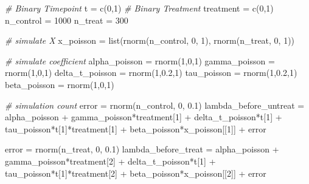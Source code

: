 \documentclass[
]{article}
\newenvironment{Shaded}{\begin{snugshade}}{\end{snugshade}}
\newcommand{\CommentTok}[1]{\textcolor[rgb]{0.56,0.35,0.01}{\textit{#1}}}
\newcommand{\DecValTok}[1]{\textcolor[rgb]{0.00,0.00,0.81}{#1}}
\newcommand{\FloatTok}[1]{\textcolor[rgb]{0.00,0.00,0.81}{#1}}
\newcommand{\FunctionTok}[1]{\textcolor[rgb]{0.00,0.00,0.00}{#1}}
\newcommand{\NormalTok}[1]{#1}
\newcommand{\OtherTok}[1]{\textcolor[rgb]{0.56,0.35,0.01}{#1}}
\newcommand{\SpecialCharTok}[1]{\textcolor[rgb]{0.00,0.00,0.00}{#1}}
\begin{document}
\begin{Shaded}
\begin{Highlighting}[]
\CommentTok{\# Binary Timepoint}
\NormalTok{t }\OtherTok{=} \FunctionTok{c}\NormalTok{(}\DecValTok{0}\NormalTok{,}\DecValTok{1}\NormalTok{)}
\CommentTok{\# Binary Treatment}
\NormalTok{treatment }\OtherTok{=} \FunctionTok{c}\NormalTok{(}\DecValTok{0}\NormalTok{,}\DecValTok{1}\NormalTok{)}
\NormalTok{n\_control }\OtherTok{=} \DecValTok{1000}
\NormalTok{n\_treat }\OtherTok{=} \DecValTok{300}

\CommentTok{\# simulate X}
\NormalTok{x\_poisson }\OtherTok{=} \FunctionTok{list}\NormalTok{(}\FunctionTok{rnorm}\NormalTok{(n\_control, }\DecValTok{0}\NormalTok{, }\DecValTok{1}\NormalTok{), }\FunctionTok{rnorm}\NormalTok{(n\_treat, }\DecValTok{0}\NormalTok{, }\DecValTok{1}\NormalTok{))}

\CommentTok{\# simulate coefficient}
\NormalTok{alpha\_poisson }\OtherTok{=} \FunctionTok{rnorm}\NormalTok{(}\DecValTok{1}\NormalTok{,}\DecValTok{0}\NormalTok{,}\DecValTok{1}\NormalTok{)}
\NormalTok{gamma\_poisson }\OtherTok{=} \FunctionTok{rnorm}\NormalTok{(}\DecValTok{1}\NormalTok{,}\DecValTok{0}\NormalTok{,}\DecValTok{1}\NormalTok{)}
\NormalTok{delta\_t\_poisson }\OtherTok{=} \FunctionTok{rnorm}\NormalTok{(}\DecValTok{1}\NormalTok{,}\FloatTok{0.2}\NormalTok{,}\DecValTok{1}\NormalTok{)}
\NormalTok{tau\_poisson }\OtherTok{=} \FunctionTok{rnorm}\NormalTok{(}\DecValTok{1}\NormalTok{,}\FloatTok{0.2}\NormalTok{,}\DecValTok{1}\NormalTok{)}
\NormalTok{beta\_poisson }\OtherTok{=} \FunctionTok{rnorm}\NormalTok{(}\DecValTok{1}\NormalTok{,}\DecValTok{0}\NormalTok{,}\DecValTok{1}\NormalTok{)}

\CommentTok{\# simulation count}
\NormalTok{error }\OtherTok{=} \FunctionTok{rnorm}\NormalTok{(n\_control, }\DecValTok{0}\NormalTok{, }\FloatTok{0.1}\NormalTok{)}
\NormalTok{lambda\_before\_untreat }\OtherTok{=}\NormalTok{ alpha\_poisson }\SpecialCharTok{+}\NormalTok{ gamma\_poisson}\SpecialCharTok{*}\NormalTok{treatment[}\DecValTok{1}\NormalTok{] }\SpecialCharTok{+}\NormalTok{ delta\_t\_poisson}\SpecialCharTok{*}\NormalTok{t[}\DecValTok{1}\NormalTok{] }\SpecialCharTok{+} 
\NormalTok{  tau\_poisson}\SpecialCharTok{*}\NormalTok{t[}\DecValTok{1}\NormalTok{]}\SpecialCharTok{*}\NormalTok{treatment[}\DecValTok{1}\NormalTok{] }\SpecialCharTok{+}\NormalTok{ beta\_poisson}\SpecialCharTok{*}\NormalTok{x\_poisson[[}\DecValTok{1}\NormalTok{]] }\SpecialCharTok{+}\NormalTok{ error}

\NormalTok{error }\OtherTok{=} \FunctionTok{rnorm}\NormalTok{(n\_treat, }\DecValTok{0}\NormalTok{, }\FloatTok{0.1}\NormalTok{)}
\NormalTok{lambda\_before\_treat }\OtherTok{=}\NormalTok{ alpha\_poisson }\SpecialCharTok{+}\NormalTok{ gamma\_poisson}\SpecialCharTok{*}\NormalTok{treatment[}\DecValTok{2}\NormalTok{] }\SpecialCharTok{+}\NormalTok{ delta\_t\_poisson}\SpecialCharTok{*}\NormalTok{t[}\DecValTok{1}\NormalTok{] }\SpecialCharTok{+} 
\NormalTok{  tau\_poisson}\SpecialCharTok{*}\NormalTok{t[}\DecValTok{1}\NormalTok{]}\SpecialCharTok{*}\NormalTok{treatment[}\DecValTok{2}\NormalTok{] }\SpecialCharTok{+}\NormalTok{ beta\_poisson}\SpecialCharTok{*}\NormalTok{x\_poisson[[}\DecValTok{2}\NormalTok{]] }\SpecialCharTok{+}\NormalTok{ error}


\end{Highlighting}
\end{Shaded}
\end{document}
